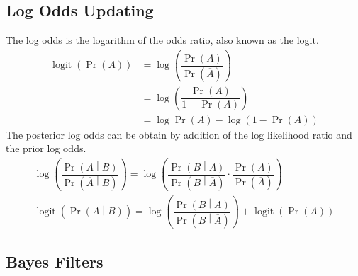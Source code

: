 \documentclass[11pt]{report} %
\begin{document}
\subsection{Log Odds Updating}

The log odds is the logarithm of the odds ratio, also known as the logit.
\begin{align}
\operatorname{logit}\left(\operatorname{Pr}\left(A\right)\right) &= \log\left(\dfrac{\operatorname{Pr}\left(A\right)}{\operatorname{Pr}\left(\overline{A}\right)}\right) \\
&= \log\left(\dfrac{\operatorname{Pr}\left(A\right)}{1 - \operatorname{Pr}\left(A\right)}\right) \\
&= \log\operatorname{Pr}\left(A\right) - \log\left(1 - \operatorname{Pr}\left(A\right)\right)
\end{align}
The posterior log odds can be obtain by addition of the log likelihood ratio and the prior log odds.
\begin{gather}
\log\left(\dfrac{\operatorname{Pr}\left(A\middle|B\right)}{\operatorname{Pr}\left(\overline{A}\middle|B\right)}\right) = \log\left(\dfrac{\operatorname{Pr}\left(B\middle|A\right)}{\operatorname{Pr}\left(B\middle|\overline{A}\right)}\cdot\dfrac{\operatorname{Pr}\left(A\right)}{\operatorname{Pr}\left(\overline{A}\right)}\right) \\
\operatorname{logit}\left(\operatorname{Pr}\left(A\middle|B\right)\right) = \log\left(\dfrac{\operatorname{Pr}\left(B\middle|A\right)}{\operatorname{Pr}\left(B\middle|\overline{A}\right)}\right) + \operatorname{logit}\left(\operatorname{Pr}\left(A\right)\right)
\end{gather}

\subsection{Bayes Filters \cite{Thrun2005, Brown2012}}
\end{document}
